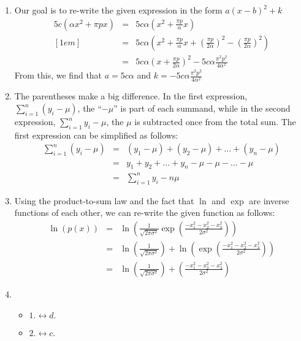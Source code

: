 \documentclass{article}
\begin{document}
    \begin{enumerate}
        \item Our goal is to re-write the given expression in the form $a(x-b)^2 + k$
        \begin{eqnarray*}
        5c(\alpha x^2 + \pi p x) &=& 5c\alpha (x^2+\frac{\pi p}{\alpha}x) \\ [1em]
        &=& 5c\alpha \left(x^2+\frac{\pi p}{\alpha}x+\left(\frac{\pi p}{2\alpha}\right)^2-\left(\frac{\pi p}{2\alpha}\right)^2\right) \\[1em]
        &=& 5c\alpha \left(x+\frac{\pi p}{2\alpha}\right)^2- 5c\alpha \frac{\pi^2 p^2}{4\alpha^2} 
        \end{eqnarray*}
        From this, we find that $a=5c\alpha$ and $k=- 5c\alpha \frac{\pi^2 p^2}{4\alpha^2} $
        \item The parentheses make a big difference. In the first expression, $\sum_{i=1}^n (y_i - \mu)$, the ``$-\mu$'' is part of each summand, while in the second expression, $\sum_{i=1}^n y_i - \mu$, the $\mu$ is subtracted once from the total sum. The first expression can be simplified as follows:
        \begin{eqnarray*}
        \sum_{i=1}^n (y_i - \mu) &=&
        (y_1-\mu) + (y_2 - \mu) + \ldots + (y_n - \mu)\\ 
        &=&y_1 + y_2 + \ldots + y_n - \mu - \mu - \ldots - \mu \\
        &=& \sum_{i=1}^n y_i - n\mu
        \end{eqnarray*}
        \item Using the product-to-sum law and the fact that $\ln$ and $\exp$ are inverse functions of each other, we can re-write the given function as follows:
        \begin{eqnarray*}
        \ln(p(x)) &=& \ln\left(\frac{1}{\sqrt{2\pi \sigma^2}}\exp\left( \frac{-x_1^2-x_2^2-x_3^2}{2\sigma^2}\right)\right) \\[1em]
        &=& \ln\left(\frac{1}{\sqrt{2\pi \sigma^2}}\right) + \ln\left(\exp\left( \frac{-x_1^2-x_2^2-x_3^2}{2\sigma^2}\right) \right) \\[1em]
        &=&\ln\left(\frac{1}{\sqrt{2\pi \sigma^2}}\right) +\left( \frac{-x_1^2-x_2^2-x_3^2}{2\sigma^2}\right)
        \end{eqnarray*}
        \item \begin{itemize}
            \item $1.\leftrightarrow d.$
            \item $2.\leftrightarrow c.$

\end{itemize}
\end{enumerate}
\end{document}
